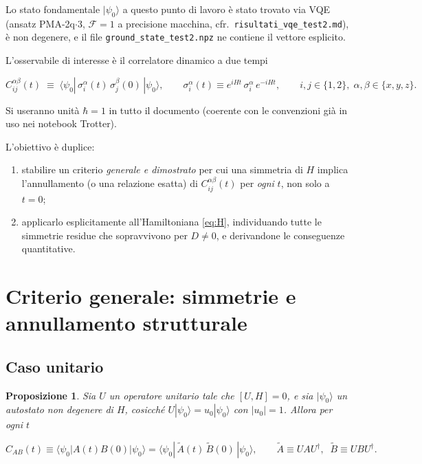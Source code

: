 \documentclass[11pt,a4paper]{article}
\newtheorem{proposizione}{Proposizione}
\begin{document}
Lo stato fondamentale $|\psi_0\rangle$ a questo punto di lavoro è stato trovato via VQE
(ansatz PMA-2q$\cdot$3, $\mathcal F=1$ a precisione macchina, cfr.\ \texttt{risultati\_vqe\_test2.md}),
è non degenere, e il file \texttt{ground\_state\_test2.npz} ne contiene il vettore esplicito.

L'osservabile di interesse è il correlatore dinamico a due tempi

\begin{equation}
C_{ij}^{\alpha\beta}(t) \;\equiv\; \langle\psi_0|\,\sigma_i^\alpha(t)\,\sigma_j^\beta(0)\,|\psi_0\rangle,
\qquad
\sigma_i^\alpha(t) \equiv e^{iHt}\,\sigma_i^\alpha\,e^{-iHt},
\qquad i,j\in\{1,2\},\;\alpha,\beta\in\{x,y,z\}.
\label{eq:corr-def}
\end{equation}

Si useranno unità $\hbar=1$ in tutto il documento (coerente con le convenzioni già in uso nei
notebook Trotter).

L'obiettivo è duplice:
\begin{enumerate}[label=(\roman*)]
\item stabilire un criterio \emph{generale e dimostrato} per cui una simmetria di $H$ implica
l'annullamento (o una relazione esatta) di $C_{ij}^{\alpha\beta}(t)$ per \emph{ogni} $t$, non solo
a $t=0$;
\item applicarlo esplicitamente all'Hamiltoniana \eqref{eq:H}, individuando tutte le simmetrie
residue che sopravvivono per $D\neq0$, e derivandone le conseguenze quantitative.
\end{enumerate}

\section{Criterio generale: simmetrie e annullamento strutturale}

\subsection{Caso unitario}
\label{sec:crit-unitario}

\begin{proposizione}
\label{prop:unitaria}
Sia $U$ un operatore unitario tale che $[U,H]=0$, e sia $|\psi_0\rangle$ un autostato non
degenere di $H$, cosicché $U|\psi_0\rangle=u_0|\psi_0\rangle$ con $|u_0|=1$. Allora per ogni $t$

\begin{equation}
C_{AB}(t) \equiv \langle\psi_0|A(t)B(0)|\psi_0\rangle
= \langle\psi_0|\,\widetilde A(t)\,\widetilde B(0)\,|\psi_0\rangle,
\qquad \widetilde A \equiv UAU^\dagger,\;\; \widetilde B\equiv UBU^\dagger.
\end{equation}
\end{proposizione}
\end{document}
